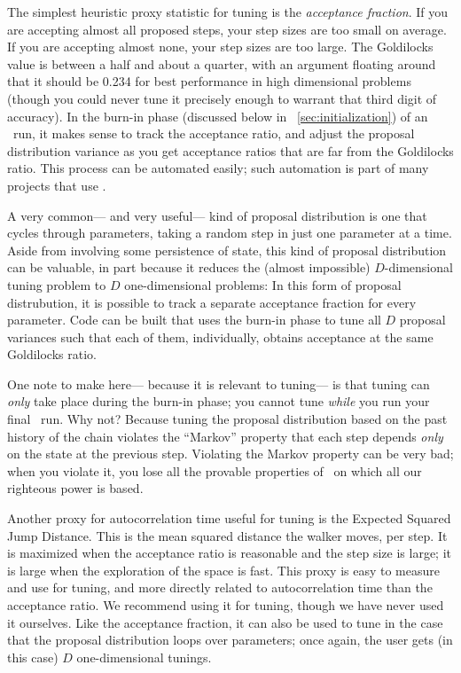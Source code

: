 \documentclass[12pt,twoside,pdftex]{article}
\newcommand{\MCMC}{\acronym{MCMC}}
\begin{document}
The simplest heuristic proxy statistic for tuning is the \emph{acceptance fraction}.
If you are accepting almost all proposed steps, your step sizes are too small on average.
If you are accepting almost none, your step sizes are too large.
The Goldilocks value is between a half and about a quarter,
  with an argument floating around that it should be 0.234 for best
  performance in high dimensional problems
  (though you could never tune it precisely enough to warrant that third digit of accuracy).
In the burn-in phase (discussed below in \sectionname~\ref{sec:initialization}) of an \MCMC\ run,
  it makes sense to track the acceptance ratio,
  and adjust the proposal distribution variance as you get acceptance ratios
  that are far from the Goldilocks ratio.
This process can be automated easily;
  such automation is part of many projects that use \MCMC.

A very common---%
  and very useful---%
  kind of proposal distribution is one that cycles through parameters,
  taking a random step in just one parameter at a time.
Aside from involving some persistence of state,
  this kind of proposal distribution can be valuable,
  in part because it reduces the (almost impossible) $D$-dimensional tuning problem
  to $D$ one-dimensional problems:
In this form of proposal distrubution,
  it is possible to track a separate acceptance fraction for every parameter.
Code can be built that uses the burn-in phase to tune all $D$ proposal variances
  such that each of them, individually,
  obtains acceptance at the same Goldilocks ratio.

One note to make here---%
  because it is relevant to tuning---%
  is that tuning can \emph{only} take place during the burn-in phase;
  you cannot tune \emph{while} you run your final \MCMC\ run.
Why not?
Because tuning the proposal distribution based on the past history of the chain
  violates the ``Markov'' property
  that each step depends \emph{only} on the state at the previous step.
Violating the Markov property can be very bad;
  when you violate it,
  you lose all the provable properties of \MCMC\ 
  on which all our righteous power is based.

Another proxy for autocorrelation time useful for tuning is the
  Expected Squared Jump Distance.
This is the mean squared distance the walker moves, per step.
It is maximized when the acceptance ratio is reasonable
  and the step size is large;
  it is large when the exploration of the space is fast.
This proxy is easy to measure and use for tuning,
  and more directly related to autocorrelation time than the acceptance ratio.
We recommend using it for tuning, though we have never used it ourselves.
Like the acceptance fraction, it can also be used to tune
  in the case that the proposal distribution loops over parameters;
  once again, the user gets (in this case) $D$ one-dimensional tunings.
\end{document}
